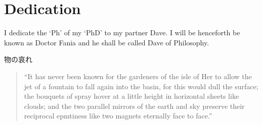 
\pagestyle{empty}

\chapter{Dedication}





I dedicate the `Ph' of my `PhD' to my partner Dave. I will be henceforth be known as Doctor Fania and he shall be called Dave of Philosophy.

\begin{CJK}{UTF8}{min}
  物の哀れ
\end{CJK}

\begin{quote}
  ``It has never been known for the gardeners of the isle of Her to allow the jet of a fountain to fall again into the basin, for this would dull the surface; the bouquets of spray hover at a little height in horizontal sheets like clouds; and the two parallel mirrors of the earth and sky preserve their reciprocal epmtiness like two magnets eternally face to face.'' \autocite[p.49]{Jarry1996}
\end{quote}

\clearpage
